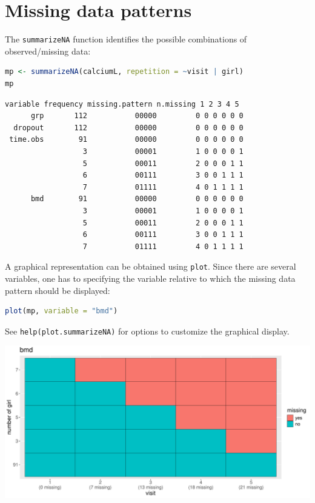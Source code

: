 \documentclass[12pt]{article}
\begin{document}
\clearpage
\section{Missing data patterns}
\label{sec:orge2faf99}

The \texttt{summarizeNA} function identifies the possible combinations of
observed/missing data:
\begin{lstlisting}[language=r,numbers=none]
mp <- summarizeNA(calciumL, repetition = ~visit | girl)
mp
\end{lstlisting}

\label{}
\begin{verbatim}
variable frequency missing.pattern n.missing 1 2 3 4 5
      grp       112           00000         0 0 0 0 0 0
  dropout       112           00000         0 0 0 0 0 0
 time.obs        91           00000         0 0 0 0 0 0
                  3           00001         1 0 0 0 0 1
                  5           00011         2 0 0 0 1 1
                  6           00111         3 0 0 1 1 1
                  7           01111         4 0 1 1 1 1
      bmd        91           00000         0 0 0 0 0 0
                  3           00001         1 0 0 0 0 1
                  5           00011         2 0 0 0 1 1
                  6           00111         3 0 0 1 1 1
                  7           01111         4 0 1 1 1 1
\end{verbatim}

A graphical representation can be obtained using \texttt{plot}. Since there
are several variables, one has to specifying the variable relative to
which the missing data pattern should be displayed:
\begin{lstlisting}[language=r,numbers=none]
plot(mp, variable = "bmd")
\end{lstlisting}

See \texttt{help(plot.summarizeNA)} for options to customize the graphical
display.

\begin{center}
\includegraphics[trim={0 0 0 0},width=1\textwidth]{./figures/summarizeNA.pdf}
\end{center}
\end{document}
